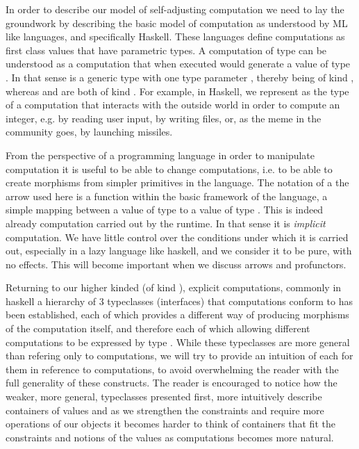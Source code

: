 In order to describe our model of self-adjusting computation we need
to lay the groundwork by describing the basic model of computation as
understood by ML like languages, and specifically Haskell. These
languages define computations as first class values that have
parametric types. A computation of type  can be understood
as a computation that when executed would generate a value of type
. In that sense  is a generic type with one type
parameter , thereby being of kind \hask{* -> *}, whereas
 and  are both of kind \hask{*}. For example,
in Haskell, we represent as  the type of a computation
that interacts with the outside world in order to compute an integer,
e.g. by reading user input, by writing files, or, as the meme in the
community goes, by launching missiles.

From the perspective of a programming language in order to manipulate
computation it is useful to be able to change computations, i.e. to be
able to create morphisms  from simpler primitives in the
language. The notation of a the arrow \hask{->} used here is a function
within the basic framework of the language, a simple mapping between a
value of type  to a value of type . This is indeed already
computation carried out by the runtime.  In that sense it is
\emph{implicit} computation. We have little control over the
conditions under which it is carried out, especially in a lazy
language like haskell, and we consider it to be pure, with no
effects. This will become important when we discuss arrows and
profunctors.

Returning to our higher kinded (of kind \hask{* -> *}), explicit
computations, commonly in haskell a hierarchy of 3 typeclasses
(interfaces) that computations conform to has been established, each
of which provides a different way of producing morphisms of the
computation itself, and therefore each of which allowing different
computations to be expressed by type . While these typeclasses are
more general than refering only to computations, we will try to
provide an intuition of each for them in reference to computations, to
avoid overwhelming the reader with the full generality of these
constructs. The reader is encouraged to notice how the weaker, more
general, typeclasses presented first, more intuitively describe
containers of values and as we strengthen the constraints and require
more operations of our objects it becomes harder to think of
containers that fit the constraints and notions of the values as
computations becomes more natural.

